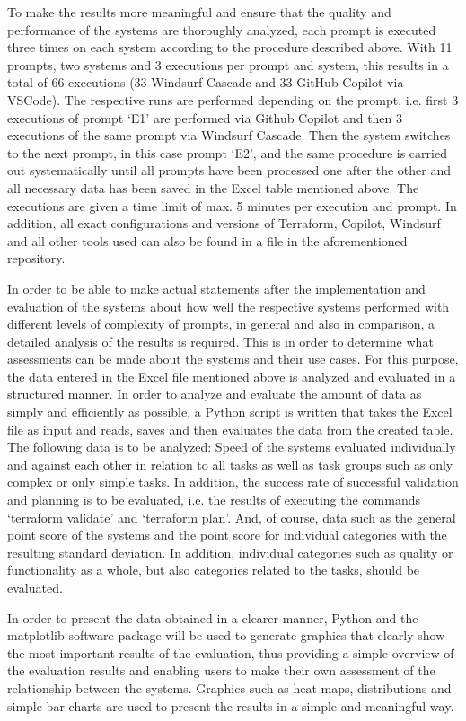 To make the results more meaningful and ensure that the quality and performance of the systems are thoroughly analyzed, each prompt is executed three times on each system according to the procedure described above. With 11 prompts, two systems and 3 executions per prompt and system, this results in a total of 66 executions (33 Windsurf Cascade and 33 GitHub Copilot via VSCode). The respective runs are performed depending on the prompt, i.e. first 3 executions of prompt ‘E1’ are performed via Github Copilot and then 3 executions of the same prompt via Windsurf Cascade. Then the system switches to the next prompt, in this case prompt ‘E2’, and the same procedure is carried out systematically until all prompts have been processed one after the other and all necessary data has been saved in the Excel table mentioned above. The executions are given a time limit of max. 5 minutes per execution and prompt. In addition, all exact configurations and versions of Terraform, Copilot, Windsurf and all other tools used can also be found in a file in the aforementioned repository.

In order to be able to make actual statements after the implementation and evaluation of the systems about how well the respective systems performed with different levels of complexity of prompts, in general and also in comparison, a detailed analysis of the results is required. This is in order to determine what assessments can be made about the systems and their use cases. For this purpose, the data entered in the Excel file mentioned above is analyzed and evaluated in a structured manner. In order to analyze and evaluate the amount of data as simply and efficiently as possible, a Python script is written that takes the Excel file as input and reads, saves and then evaluates the data from the created table. The following data is to be analyzed: Speed of the systems evaluated individually and against each other in relation to all tasks as well as task groups such as only complex or only simple tasks. In addition, the success rate of successful validation and planning is to be evaluated, i.e. the results of executing the commands ‘terraform validate’ and ‘terraform plan’. And, of course, data such as the general point score of the systems and the point score for individual categories with the resulting standard deviation. In addition, individual categories such as quality or functionality as a whole, but also categories related to the tasks, should be evaluated.

In order to present the data obtained in a clearer manner, Python and the matplotlib software package will be used to generate graphics that clearly show the most important results of the evaluation, thus providing a simple overview of the evaluation results and enabling users to make their own assessment of the relationship between the systems. Graphics such as heat maps, distributions and simple bar charts are used to present the results in a simple and meaningful way.